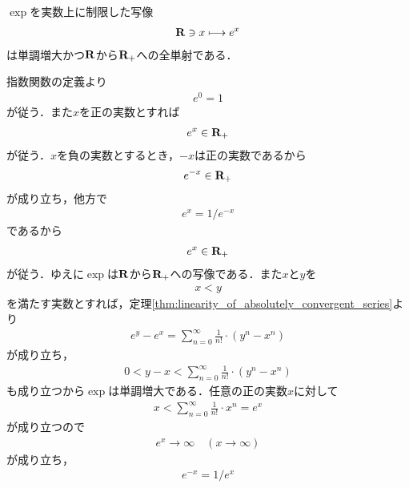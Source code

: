	\begin{screen}
		\begin{thm}[指数関数は実数上で単調増大かつ一対一対応]\label{thm:real_valued_exponential_function}
			$\exp$を実数上に制限した写像
			\begin{align}
				\mathbf{R} \ni x \longmapsto e^x
			\end{align}
			は単調増大かつ$\mathbf{R}$から$\mathbf{R}_+$への全単射である．
		\end{thm}
	\end{screen}
	
	\begin{sketch}
		指数関数の定義より
		\begin{align}
			e^0 = 1
		\end{align}
		が従う．また$x$を正の実数とすれば
		\begin{align}
			e^{x} \in \mathbf{R}_+
		\end{align}
		が従う．$x$を負の実数とするとき，$-x$は正の実数であるから
		\begin{align}
			e^{-x} \in \mathbf{R}_+
		\end{align}
		が成り立ち，他方で
		\begin{align}
			e^{x} = 1/e^{-x}
		\end{align}
		であるから
		\begin{align}
			e^{x} \in \mathbf{R}_+
		\end{align}
		が従う．ゆえに$\exp$は$\mathbf{R}$から$\mathbf{R}_+$への写像である．また$x$と$y$を
		\begin{align}
			x < y
		\end{align}
		を満たす実数とすれば，定理\ref{thm:linearity_of_absolutely_convergent_series}より
		\begin{align}
			e^{y} - e^{x} = \sum_{n=0}^{\infty} \frac{1}{n!} \cdot (y^n - x^n) 
		\end{align}
		が成り立ち，
		\begin{align}
			0 < y - x < \sum_{n=0}^{\infty} \frac{1}{n!} \cdot (y^n - x^n) 
		\end{align}
		も成り立つから$\exp$は単調増大である．任意の正の実数$x$に対して
		\begin{align}
			x < \sum_{n=0}^{\infty} \frac{1}{n!} \cdot x^n = e^{x}
		\end{align}
		が成り立つので
		\begin{align}
			e^x \longrightarrow \infty \quad (x \longrightarrow \infty)
		\end{align}
		が成り立ち，
		\begin{align}
			e^{-x} = 1/e^{x}
		\end{align}

\end{sketch}
